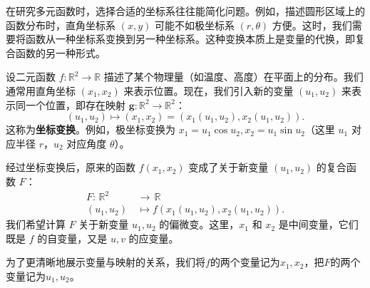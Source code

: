 \documentclass[12pt,UTF8,fontset=none]{ctexbook}
\begin{document}
在研究多元函数时，选择合适的坐标系往往能简化问题。例如，描述圆形区域上的函数分布时，直角坐标系 $(x, y)$ 可能不如极坐标系 $(r, \theta)$ 方便。这时，我们需要将函数从一种坐标系变换到另一种坐标系。这种变换本质上是变量的代换，即复合函数的另一种形式。

设二元函数 $f: \mathbb{R}^2 \to \mathbb{R}$ 描述了某个物理量（如温度、高度）在平面上的分布。我们通常用直角坐标 $(x_1, x_2)$ 来表示位置。现在，我们引入新的变量 $(u_1, u_2)$ 来表示同一个位置，即存在映射 $\mathbf{g}: \mathbb{R}^2 \to \mathbb{R}^2$：
$$ (u_1, u_2) \mapsto (x_1, x_2) = (x_1(u_1, u_2), x_2(u_1, u_2)). $$
这称为\textbf{坐标变换}。例如，极坐标变换为 $x_1 = u_1 \cos{u_2}, x_2 = u_1 \sin{u_2}$（这里 $u_1$ 对应半径 $r$，$u_2$ 对应角度 $\theta$）。

经过坐标变换后，原来的函数 $f(x_1, x_2)$ 变成了关于新变量 $(u_1, u_2)$ 的复合函数 $F$：
\begin{align*}
    F: \,\mathbb{R}^2 &\to\, \mathbb{R}\\
    (u_1, u_2) \, &\mapsto f(x_1(u_1, u_2), x_2(u_1, u_2)).
\end{align*}
我们希望计算 $F$ 关于新变量 $u_1, u_2$ 的偏微变。这里，$x_1$ 和 $x_2$ 是中间变量，它们既是 $f$ 的自变量，又是 $u, v$ 的应变量。

为了更清晰地展示变量与映射的关系，我们将$f$的两个变量记为$x_1,x_2$，把$F$的两个变量记为$u_1,u_2$。

\end{document}
